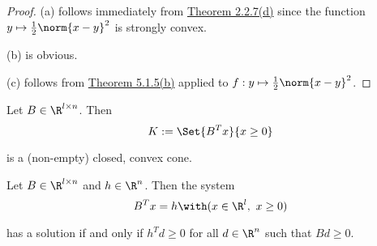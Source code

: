 \begin{proof}
  (a) follows immediately from \href{f546fc9}{Theorem 2.2.7(d)} since
  the function $y\mapsto\frac12\norm{x-y}^2$ is strongly convex.

  (b) is obvious.

  (c) follows from \href{c8e5836}{Theorem 5.1.5(b)} applied to
  $f:y\mapsto\frac12\norm{x-y}^2$.
\end{proof}

\label{d2dff14}

Let $B\in\R^{l\times n}$. Then
$$
  K:=\Set{B^Tx}{x\geq0}
$$

is a (non-empty) closed, convex cone.

\label{d64b0db}

Let $B\in\R^{l\times n}$ and $h\in\R^n$. Then the system
$$
  B^Tx=h\with(x\in\R^l,\ x\geq0)
$$

has a solution if and only if $h^Td\geq0$ for all $d\in\R^n$ such that
$Bd\geq0$.

